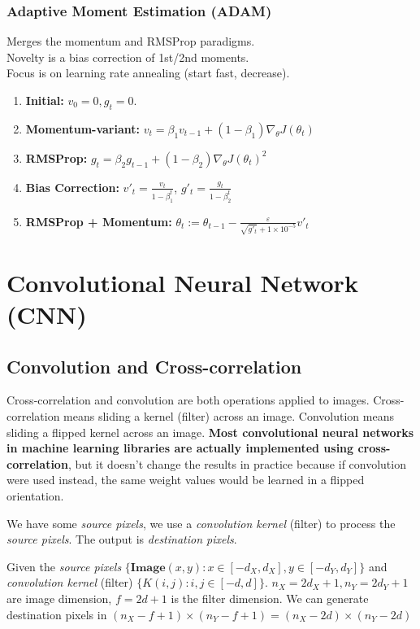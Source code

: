 \documentclass[11pt,a4paper]{article}
\begin{document}
\subsubsection{Adaptive Moment Estimation (ADAM)}
Merges the momentum and RMSProp paradigms.\\
Novelty is a bias correction of 1st/2nd moments.\\
Focus is on learning rate annealing (start fast, decrease).
\begin{enumerate}[(1)]
    \item \textbf{Initial:} $v_0=0,g_t=0$.
    \item \textbf{Momentum-variant:} $v_t=\beta_1 v_{t-1}+(1-\beta_1) \nabla_\theta J(\theta_t)$
    \item \textbf{RMSProp:} $g_t=\beta_2 g_{t-1}+(1-\beta_2) \nabla_\theta J(\theta_t)^2$
    \item \textbf{Bias Correction:} $v'_t=\frac{v_t}{1-\beta_1^t}$, $g'_t=\frac{g_t}{1-\beta_2^t}$
    \item \textbf{RMSProp + Momentum:} $\theta_t:=\theta_{t-1}-\frac{\varepsilon}{\sqrt{g'_t}+1\times 10^{-5}}v'_t$
\end{enumerate}



\section{Convolutional Neural Network (CNN)}
\subsection{Convolution and Cross-correlation}
Cross-correlation and convolution are both operations applied to images. Cross-correlation means sliding a kernel (filter) across an image. Convolution means sliding a flipped kernel across an image. \textbf{Most convolutional neural networks in machine learning libraries are actually implemented using cross-correlation}, but it doesn't change the results in practice because if convolution were used instead, the same weight values would be learned in a flipped orientation.

We have some \textit{source pixels}, we use a \textit{convolution kernel} (filter) to process the \textit{source pixels}. The output is \textit{destination pixels}.

Given the \textit{source pixels} $\{\textbf{Image}(x,y):x\in [-d_X,d_X],y\in [-d_Y,d_Y]\}$ and \textit{convolution kernel} (filter) $\{K(i,j):i,j\in[-d,d]\}$. $n_X=2d_X+1,n_Y=2d_Y+1$ are image dimension, $f=2d+1$ is the filter dimension. We can generate destination pixels in $(n_X-f+1)\times (n_Y-f+1) = (n_X-2d)\times (n_Y-2d)$
\end{document}
